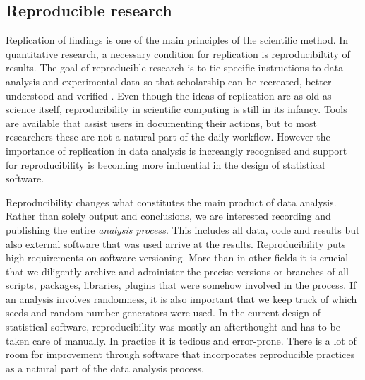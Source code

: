 \documentclass{article}
\begin{document}
\subsection{Reproducible research}

Replication of findings is one of the main principles of the scientific method. In quantitative research, a necessary condition for replication is reproducibiltity of results. The goal of reproducible research is to tie specific instructions to data analysis and experimental data so that scholarship can be recreated, better understood and verified \citep{cranRR}. Even though the ideas of replication are as old as science itself, reproducibility in scientific computing is still in its infancy. Tools are available that assist users in documenting their actions, but to most researchers these are not a natural part of the daily workflow. However the importance of replication in data analysis is increangly recognised and support for reproducibility is becoming more influential in the design of statistical software.

Reproducibility changes what constitutes the main product of data analysis. Rather than solely output and conclusions, we are interested recording and publishing the entire \emph{analysis process}. This includes all data, code and results but also external software that was used arrive at the results. Reproducibility puts high requirements on software versioning. More than in other fields it is crucial that we diligently archive and administer the precise versions or branches of all scripts, packages, libraries, plugins that were somehow involved in the process. If an analysis involves randomness, it is also important that we keep track of which seeds and random number generators were used. In the current design of statistical software, reproducibility was mostly an afterthought and has to be taken care of manually. In practice it is tedious and error-prone. There is a lot of room for improvement through software that incorporates reproducible practices as a natural part of the data analysis process.
\end{document}
